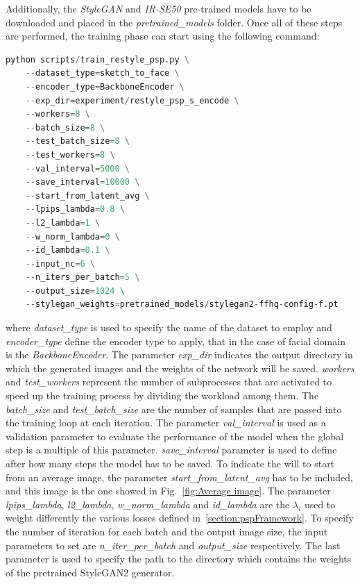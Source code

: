  Additionally, the \textit{StyleGAN} and \textit{IR-SE50} pre-trained models have to be downloaded and placed in the \textit{pretrained\_models} folder.
 Once all of these steps are performed, the training phase can start using the following command:
 \begin{lstlisting}[language=Python, numbers=none]
    python scripts/train_restyle_psp.py \
    --dataset_type=sketch_to_face \
    --encoder_type=BackboneEncoder \
    --exp_dir=experiment/restyle_psp_s_encode \
    --workers=8 \
    --batch_size=8 \
    --test_batch_size=8 \
    --test_workers=8 \
    --val_interval=5000 \
    --save_interval=10000 \
    --start_from_latent_avg \
    --lpips_lambda=0.8 \
    --l2_lambda=1 \
    --w_norm_lambda=0 \
    --id_lambda=0.1 \
    --input_nc=6 \
    --n_iters_per_batch=5 \
    --output_size=1024 \
    --stylegan_weights=pretrained_models/stylegan2-ffhq-config-f.pt
 \end{lstlisting}
where \textit{dataset\_type} is used to specify the name of the dataset to employ and  \textit{encoder\_type} define the encoder type to apply, that in the case of facial domain is the \textit{BackboneEncoder}. 
The parameter \textit{exp\_dir} indicates the output directory in which the generated images and the weights of the network will be saved. 
\textit{workers} and \textit{test\_workers} represent the number of subprocesses that are activated to speed up the training process by dividing the workload among them. 
The \textit{batch\_size} and \textit{test\_batch\_size} are the number of samples that are passed into the training loop at each iteration. 
The parameter \textit{val\_interval} is used as a validation parameter to evaluate the performance of the model when the global step is a multiple of this parameter. 
\textit{save\_interval} parameter is used to define after how many steps the model has to be saved. To indicate the will to start from an average image, the parameter \textit{start\_from\_latent\_avg} has to be included, and this image is the one showed in Fig.~\ref{fig:Average image}. The parameter \textit{lpips\_lambda}, \textit{l2\_lambda}, \textit{w\_norm\_lambda} and \textit{id\_lambda} are the $\lambda_i$ used to weight differently the various losses defined in~\ref{section:pspFramework}.
To specify the number of iteration for each batch and the output image size, the input parameters to set are \textit{n\_iter\_per\_batch} and \textit{output\_size} respectively. The last parameter is used to specify the path to the directory which contains the weights of the pretrained StyleGAN2 generator.\\
